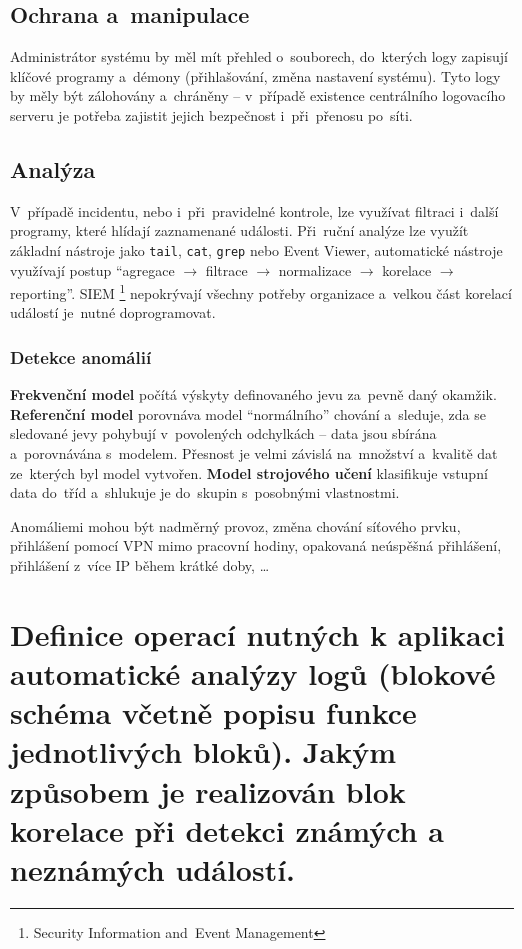\subsection{Ochrana a~manipulace}

Administrátor systému by měl mít přehled o~souborech, do~kterých logy zapisují klíčové programy a~démony (přihlašování, změna nastavení systému). Tyto logy by měly být zálohovány a~chráněny -- v~případě existence centrálního logovacího serveru je potřeba zajistit jejich bezpečnost i~při~přenosu po~síti.

\subsection{Analýza}

V~případě incidentu, nebo i~při~pravidelné kontrole, lze využívat filtraci i~další programy, které hlídají zaznamenané události. Při~ruční analýze lze využít základní nástroje jako \texttt{tail}, \texttt{cat}, \texttt{grep} nebo Event Viewer, automatické nástroje využívají postup \enquote{agregace $\rightarrow$ filtrace $\rightarrow$ normalizace $\rightarrow$ korelace $\rightarrow$ reporting}. SIEM%
\footnote{Security Information and~Event Management} %
nepokrývají všechny potřeby organizace a~velkou část korelací událostí je~nutné doprogramovat.

\subsubsection{Detekce anomálií}

\textbf{Frekvenční model} počítá výskyty definovaného jevu za~pevně daný okamžik. \textbf{Referenční model} porovnáva model \enquote{normálního} chování a~sleduje, zda se sledované jevy pohybují v~povolených odchylkách -- data jsou sbírána a~porovnávána s~modelem. Přesnost je velmi závislá na~množství a~kvalitě dat ze~kterých byl model vytvořen. \textbf{Model strojového učení} klasifikuje vstupní data do~tříd a~shlukuje je do~skupin s~posobnými vlastnostmi.

Anomáliemi mohou být nadměrný provoz, změna chování síťového prvku, přihlášení pomocí VPN mimo pracovní hodiny, opakovaná neúspěšná přihlášení, přihlášení z~více IP během krátké doby, \dots

\clearpage
\section{Definice operací nutných k aplikaci automatické analýzy logů (blokové schéma včetně popisu funkce jednotlivých bloků). Jakým způsobem je realizován blok korelace při detekci známých a neznámých událostí.}


